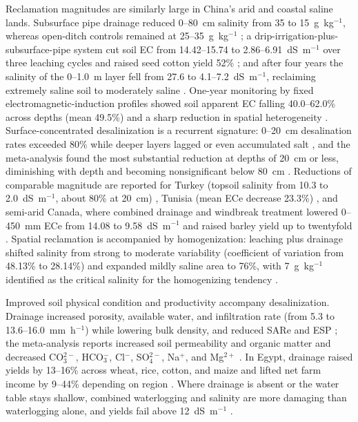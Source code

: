 Reclamation magnitudes are similarly large in China's arid and coastal saline lands. Subsurface pipe drainage reduced 0--80~cm salinity from 35 to 15~g~kg$^{-1}$, whereas open-ditch controls remained at 25--35~g~kg$^{-1}$ \parencite{Wang2020}; a drip-irrigation-plus-subsurface-pipe system cut soil EC from 14.42--15.74 to 2.86--6.91~dS~m$^{-1}$ over three leaching cycles and raised seed cotton yield 52\% \parencite{Heng2021}; and after four years the salinity of the 0--1.0~m layer fell from 27.6 to 4.1--7.2~dS~m$^{-1}$, reclaiming extremely saline soil to moderately saline \parencite{Zhang2021}. One-year monitoring by fixed electromagnetic-induction profiles showed soil apparent EC falling 40.0--62.0\% across depths (mean 49.5\%) and a sharp reduction in spatial heterogeneity \parencite{Yu2025}. Surface-concentrated desalinization is a recurrent signature: 0--20~cm desalination rates exceeded 80\% while deeper layers lagged or even accumulated salt \parencite{Han2023}, and the meta-analysis found the most substantial reduction at depths of 20~cm or less, diminishing with depth and becoming nonsignificant below 80~cm \parencite{Yang2025}. Reductions of comparable magnitude are reported for Turkey (topsoil salinity from 10.3 to 2.0~dS~m$^{-1}$, about 80\% at 20~cm) \parencite{Bahçeci2009}, Tunisia (mean ECe decrease 23.3\%) \parencite{HajAmor2019}, and semi-arid Canada, where combined drainage and windbreak treatment lowered 0--450~mm ECe from 14.08 to 9.58~dS~m$^{-1}$ and raised barley yield up to twentyfold \parencite{Steppuhn2006,Steppuhn2017}. Spatial reclamation is accompanied by homogenization: leaching plus drainage shifted salinity from strong to moderate variability (coefficient of variation from 48.13\% to 28.14\%) and expanded mildly saline area to 76\%, with 7~g~kg$^{-1}$ identified as the critical salinity for the homogenizing tendency \parencite{Yu2015}.

Improved soil physical condition and productivity accompany desalinization. Drainage increased porosity, available water, and infiltration rate (from 5.3 to 13.6--16.0~mm~h$^{-1}$) while lowering bulk density, and reduced SARe and ESP \parencite{Sharma2000}; the meta-analysis reports increased soil permeability and organic matter and decreased CO$_3^{2-}$, HCO$_3^-$, Cl$^-$, SO$_4^{2-}$, Na$^+$, and Mg$^{2+}$ \parencite{Yang2025}. In Egypt, drainage raised yields by 13--16\% across wheat, rice, cotton, and maize and lifted net farm income by 9--44\% depending on region \parencite{Kotb2000}. Where drainage is absent or the water table stays shallow, combined waterlogging and salinity are more damaging than waterlogging alone, and yields fail above 12~dS~m$^{-1}$ \parencite{Kahlown2002}.

